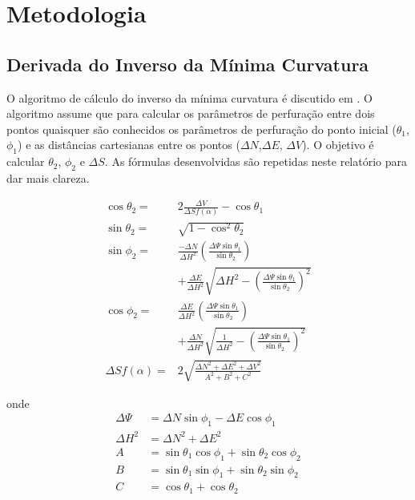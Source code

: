 \documentclass[final,5p]{elsarticle}
\numberwithin{equation}{section}
\begin{document}
\section{Metodologia}

\subsection{Derivada do Inverso da Mínima Curvatura}

O algoritmo de cálculo do inverso da mínima curvatura é discutido em \cite{relatoriobisseccao}. O algoritmo assume que para calcular os parâmetros de perfuração entre dois pontos quaisquer são conhecidos os parâmetros de perfuração do ponto inicial ($\theta_1$, $\phi_1$) e as distâncias cartesianas entre os pontos ($\Delta N$,$\Delta E$, $\Delta V$). O objetivo é calcular $\theta_2$, $\phi_2$ e $\Delta S$. As fórmulas desenvolvidas são repetidas neste relatório para dar mais clareza.

\begin{subequations}\label{eq:inversomcm}
    \begin{align}
        \cos \theta_2 =& 2 \frac{\Delta V}{\Delta S f(\alpha)} - \cos \theta_1 \label{eq:costheta2} \\ 
        \sin \theta_2 =& \sqrt{1 - \cos^2 \theta_2} \label{eq:sintheta2} \\
        \sin \phi_2 =& \frac{-\Delta N}{\Delta H^2} \left( \frac{\Delta \Psi \sin \theta_1}{\sin \theta_2} \right) \nonumber \\
        & + \frac{\Delta E}{\Delta H^2} \sqrt{\Delta H^2 - \left( \frac{\Delta \Psi \sin \theta_1}{\sin \theta_2} \right)^2} \label{eq:sinphi2} \\
        \cos \phi_2 =& \frac{\Delta E}{\Delta H^2} \left( \frac{\Delta \Psi \sin \theta_1}{\sin \theta_2} \right) \nonumber \\
        & + \frac{\Delta N}{\Delta H^2} \sqrt{\frac{1}{\Delta H^2} - \left( \frac{\Delta \Psi \sin \theta_1}{\sin \theta_2} \right)^2} \label{eq:cosphi2} \\
        \Delta S f(\alpha) =& 2 \sqrt{\frac{\Delta N^2 + \Delta E^2 + \Delta V^2}{A^2+B^2+C^2}} \label{eq:DeltaSfa}
    \end{align}
\end{subequations}

onde
\begin{align*}
    \Delta \Psi &= \Delta N \sin \phi_1 - \Delta E \cos \phi_1 \\
    \Delta H^2 &= \Delta N^2 + \Delta E^2 \\
    A &= \sin \theta_1 \cos \phi_1 + \sin \theta_2 \cos \phi_2 \\
    B &= \sin \theta_1 \sin \phi_1 + \sin \theta_2 \sin \phi_2 \\
    C &= \cos \theta_1 + \cos \theta_2
\end{align*}
\end{document}
